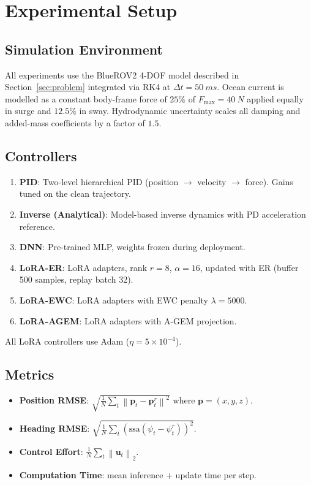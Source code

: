 \documentclass[journal]{IEEEtran}
\newcommand{\norm}[1]{\left\lVert #1 \right\rVert}
\newcommand{\bu}{\bm{u}}
\begin{document}
\section{Experimental Setup}
\label{sec:exp}

\subsection{Simulation Environment}

All experiments use the BlueROV2 4-DOF model described in
Section~\ref{sec:problem} integrated via RK4 at $\Delta t = \SI{50}{ms}$.
Ocean current is modelled as a constant body-frame force of $25\%$ of
$F_{\max} = \SI{40}{N}$ applied equally in surge and $12.5\%$ in sway.
Hydrodynamic uncertainty scales all damping and added-mass coefficients
by a factor of $1.5$.

\subsection{Controllers}

\begin{enumerate}
  \item \textbf{PID}: Two-level hierarchical PID (position $\to$ velocity
        $\to$ force). Gains tuned on the clean trajectory.
  \item \textbf{Inverse (Analytical)}: Model-based inverse dynamics with
        PD acceleration reference.
  \item \textbf{DNN}: Pre-trained MLP, weights frozen during deployment.
  \item \textbf{LoRA-ER}: LoRA adapters, rank $r=8$, $\alpha=16$, updated
        with ER (buffer 500 samples, replay batch 32).
  \item \textbf{LoRA-EWC}: LoRA adapters with EWC penalty $\lambda=5000$.
  \item \textbf{LoRA-AGEM}: LoRA adapters with A-GEM projection.
\end{enumerate}

All LoRA controllers use Adam ($\eta = 5 \times 10^{-4}$).

\subsection{Metrics}

\begin{itemize}
  \item \textbf{Position RMSE}: $\sqrt{\frac{1}{N}\sum_t \norm{\bm{p}_t - \bm{p}_t^r}^2}$
        where $\bm{p} = (x,y,z)$.
  \item \textbf{Heading RMSE}: $\sqrt{\frac{1}{N}\sum_t (\text{ssa}(\psi_t - \psi_t^r))^2}$.
  \item \textbf{Control Effort}: $\frac{1}{N}\sum_t \norm{\bu_t}_2$.
  \item \textbf{Computation Time}: mean inference + update time per step.
\end{itemize}
\end{document}
